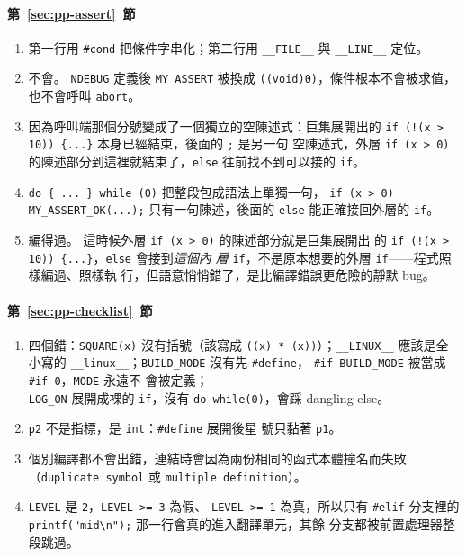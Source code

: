 \paragraph{第~\ref{sec:pp-assert}~節}
\begin{enumerate}
\item 第一行用 \texttt{\#cond} 把條件字串化；第二行用
\texttt{\_\_FILE\_\_} 與 \texttt{\_\_LINE\_\_} 定位。
\item 不會。 \texttt{NDEBUG} 定義後 \texttt{MY\_ASSERT} 被換成
\texttt{((void)0)}，條件根本不會被求值，也不會呼叫 \texttt{abort}。
\item 因為呼叫端那個分號變成了一個獨立的空陳述式：巨集展開出的
\texttt{if (!(x > 10)) \{...\}} 本身已經結束，後面的 \texttt{;} 是另一句
空陳述式，外層 \texttt{if (x > 0)} 的陳述部分到這裡就結束了，\texttt{else}
往前找不到可以接的 \texttt{if}。
\item \texttt{do \{ ... \} while (0)} 把整段包成語法上單獨一句，
\texttt{if (x > 0) MY\_ASSERT\_OK(...);} 只有一句陳述，後面的
\texttt{else} 能正確接回外層的 \texttt{if}。
\item 編得過。 這時候外層 \texttt{if (x > 0)} 的陳述部分就是巨集展開出
的 \texttt{if (!(x > 10)) \{...\}}，\texttt{else} 會接到\textit{這個內
層} \texttt{if}，不是原本想要的外層 \texttt{if}——程式照樣編過、照樣執
行，但語意悄悄錯了，是比編譯錯誤更危險的靜默 bug。
\end{enumerate}

\paragraph{第~\ref{sec:pp-checklist}~節}
\begin{enumerate}
\item 四個錯：\texttt{SQUARE(x)} 沒有括號（該寫成
\texttt{((x) * (x))}）；\texttt{\_\_LINUX\_\_} 應該是全小寫的
\texttt{\_\_linux\_\_}；\texttt{BUILD\_MODE} 沒有先 \texttt{\#define}，
\texttt{\#if BUILD\_MODE} 被當成 \texttt{\#if 0}，\texttt{MODE} 永遠不
會被定義；\\
\texttt{LOG\_ON} 展開成裸的 \texttt{if}，沒有
\texttt{do-while(0)}，會踩 dangling else。
\item \texttt{p2} 不是指標，是 \texttt{int}：\texttt{\#define} 展開後星
號只黏著 \texttt{p1}。
\item 個別編譯都不會出錯，連結時會因為兩份相同的函式本體撞名而失敗
（\texttt{duplicate symbol} 或 \texttt{multiple definition}）。
\item \texttt{LEVEL} 是 \texttt{2}，\texttt{LEVEL >= 3} 為假、
\texttt{LEVEL >= 1} 為真，所以只有 \texttt{\#elif} 分支裡的\\
\texttt{printf("mid\textbackslash n");} 那一行會真的進入翻譯單元，其餘
分支都被前置處理器整段跳過。
\end{enumerate}
